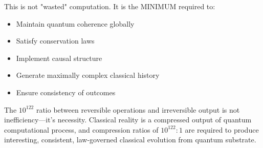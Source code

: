 This is not "wasted" computation. It is the MINIMUM required to:
\begin{itemize}
\item Maintain quantum coherence globally
\item Satisfy conservation laws
\item Implement causal structure
\item Generate maximally complex classical history
\item Ensure consistency of outcomes
\end{itemize}

The $10^{122}$ ratio between reversible operations and irreversible output is not inefficiency—it's necessity. Classical reality is a compressed output of quantum computational process, and compression ratios of $10^{122}:1$ are required to produce interesting, consistent, law-governed classical evolution from quantum substrate.
